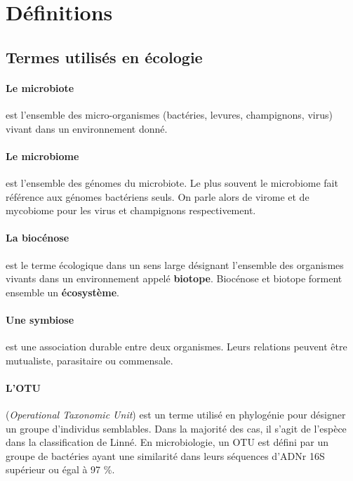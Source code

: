 \documentclass[12pt,a4paper]{article}
\begin{document}
\newpage

\section{Définitions}
\subsection{Termes utilisés en écologie}

\paragraph{Le microbiote\cite{Eisen}} est l’ensemble des micro-organismes (bactéries, levures, champignons, virus) vivant dans un environnement donné.
\paragraph{Le microbiome\cite{Eisen}} est l'ensemble des génomes du microbiote. Le plus souvent le microbiome fait référence aux génomes bactériens seuls. On parle alors de virome et de mycobiome pour les virus et champignons respectivement.

\paragraph{La biocénose} est le terme écologique dans un sens large désignant l'ensemble des organismes vivants dans un environnement appelé \textbf{biotope}. Biocénose et biotope forment ensemble un \textbf{écosystème}.

\paragraph{Une symbiose} est une association durable entre deux organismes. Leurs relations peuvent être mutualiste, parasitaire ou commensale.


\paragraph{L'OTU}(\textit{Operational Taxonomic Unit}) est un terme utilisé en phylogénie pour désigner un groupe d’individus semblables. Dans la majorité des cas, il s'agit de l'espèce dans la classification de Linné.
En microbiologie, un OTU est défini par un groupe de bactéries ayant une similarité dans leurs séquences d'ADNr 16S supérieur ou égal à 97 \%. %
\end{document}
